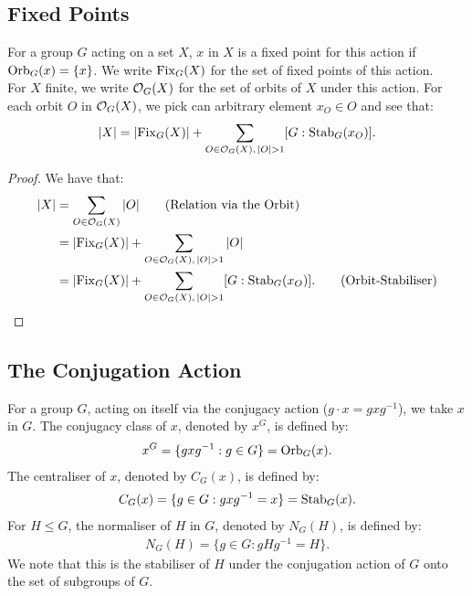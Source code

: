 \subsection{Fixed Points}

For a group $G$ acting on a set $X$, $x$ in $X$ is a fixed point
for this action if $\operatorname{Orb}_G(x) = \{x\}$.
We write $\operatorname{Fix}_G(X)$ for the set of fixed points of this action. 
\\[\baselineskip]
For $X$ finite, we write $\mathcal{O}_G(X)$
for the set of orbits of $X$ under this action. For each orbit
$O$ in $\mathcal{O}_G(X)$, we pick can arbitrary element $x_O \in O$
and see that: \begin{align*}
    |X| = |\!\operatorname{Fix}_G(X)| + \sum_{O \in \mathcal{O}_G(X), \, |O| > 1} [G : \operatorname{Stab}_G(x_O)].
\end{align*}

\begin{proof}
    We have that: \begin{align*}
        |X| &= \sum_{O \in \mathcal{O}_G(X)} |O| \tag{Relation via the Orbit} \\
        &= |\!\operatorname{Fix}_G(X)| + \sum_{O \in \mathcal{O}_G(X), \, |O| > 1} |O| \\
        &= |\!\operatorname{Fix}_G(X)| + \sum_{O \in \mathcal{O}_G(X), \, |O| > 1} [G : \operatorname{Stab}_G(x_O)]. \tag{Orbit-Stabiliser}
    \end{align*}
\end{proof}

\subsection{The Conjugation Action}

For a group $G$, acting on itself via the conjugacy action 
($g \cdot x = gxg^{-1}$), we take $x$ in $G$. The conjugacy class 
of $x$, denoted by $x^G$, is defined by: \begin{align*}
    x^G = \{gxg^{-1} : g \in G\} = \operatorname{Orb}_G(x).
\end{align*} The centraliser of $x$, denoted by $C_G(x)$, 
is defined by: \begin{align*}
    C_G(x) = \{g \in G : gxg^{-1} = x\} = \operatorname{Stab}_G(x).
\end{align*} For $H \leq G$, the normaliser of $H$ in $G$,
denoted by $N_G(H)$, is defined by: \begin{align*}
    N_G(H) = \{g \in G : gHg^{-1} = H\}.
\end{align*} We note that this is the stabiliser of $H$ under the
conjugation action of $G$ onto the set of subgroups of $G$.


